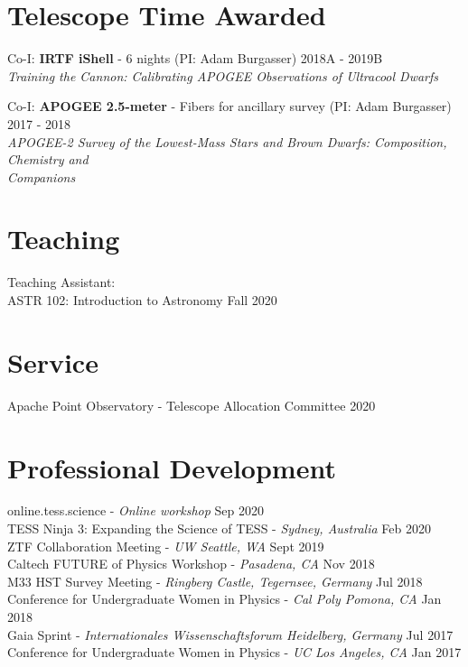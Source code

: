 \documentclass[margin,line]{resume}
\begin{document}
\begin{resume}

\section{\mysidestyle \textcolor{bcolor}{Telescope Time Awarded}}
Co-I: \textbf{IRTF iShell} - 6 nights (PI: Adam Burgasser) \hfill 2018A - 2019B \\ 
\-\hspace{.25cm} \textit{Training the Cannon: Calibrating APOGEE Observations of Ultracool Dwarfs} 

Co-I: \textbf{APOGEE 2.5-meter} - Fibers for ancillary survey (PI: Adam Burgasser) \hfill 2017 - 2018 \\
\-\hspace{.25cm} \textit{APOGEE-2 Survey of the Lowest-Mass Stars and Brown Dwarfs: Composition, Chemistry and \\\-\hspace{.25cm}  Companions}



\section{\mysidestyle \textcolor{bcolor}{Teaching}}
Teaching Assistant: \\
\-\hspace{.25cm} ASTR 102: Introduction to Astronomy \hfill Fall 2020 


\section{\mysidestyle \textcolor{bcolor}{Service}}
Apache Point Observatory - Telescope Allocation Committee \hfill 2020


\section{\mysidestyle \textcolor{bcolor}{Professional Development}}
online.tess.science - \textit{Online workshop} \hfill Sep 2020 \\
TESS Ninja 3: Expanding the Science of TESS - \textit{Sydney, Australia} \hfill Feb 2020 \\
ZTF Collaboration Meeting - \textit{UW Seattle, WA} \hfill Sept 2019 \\
Caltech FUTURE of Physics Workshop - \textit{Pasadena, CA} \hfill Nov 2018 \\
M33 HST Survey Meeting - \textit{Ringberg Castle, Tegernsee, Germany} \hfill Jul 2018 \\
Conference for Undergraduate Women in Physics - \textit{Cal Poly Pomona, CA}  \hfill Jan 2018 \\
Gaia Sprint - \textit{Internationales Wissenschaftsforum Heidelberg, Germany}  \hfill Jul 2017 \\
{Conference for Undergraduate Women in Physics} - \textit{UC Los Angeles, CA}  \hfill Jan 2017 


\end{resume}
\end{document}
